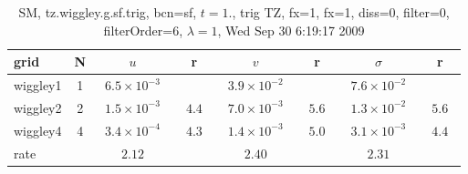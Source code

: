 \begin{table}[hbt]\tableFont %
\begin{center}
\begin{tabular}{|l|c|c|c|c|c|c|c|} \hline 
grid  & N &  $u$  & r &  $v$  & r &  $\sigma$   & r \\ \hline 
            wiggley1 &     1 & ~$6.5\times10^{ -3}$~ &           & ~$3.9\times10^{ -2}$~ &           & ~$7.6\times10^{ -2}$~ &            \\ \hline
            wiggley2 &     2 & ~$1.5\times10^{ -3}$~ & ~$  4.4$~ & ~$7.0\times10^{ -3}$~ & ~$  5.6$~ & ~$1.3\times10^{ -2}$~ & ~$  5.6$~  \\ \hline
            wiggley4 &     4 & ~$3.4\times10^{ -4}$~ & ~$  4.3$~ & ~$1.4\times10^{ -3}$~ & ~$  5.0$~ & ~$3.1\times10^{ -3}$~ & ~$  4.4$~  \\ \hline
    rate             &       &       $2.12$         &       &       $2.40$         &       &       $2.31$         &        \\ \hline
\end{tabular}
\caption{SM, tz.wiggley.g.sf.trig, bcn=sf, $t=1.$, trig TZ, fx=1, fx=1, diss=0, filter=0, filterOrder=6, $\lambda=1$, Wed Sep 30  6:19:17 2009}\label{table:tz.wiggley.g.sf.trig}
\end{center}
\end{table}
